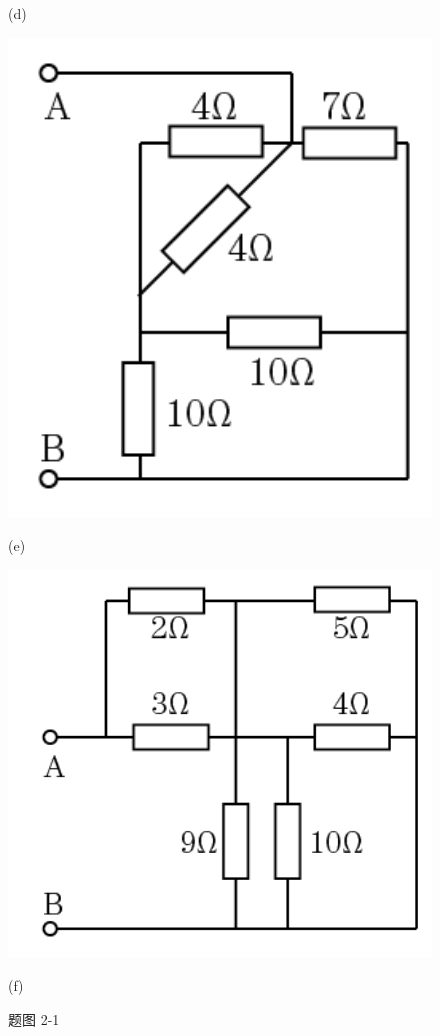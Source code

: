 \documentclass[hyperref, UTF8]{ctexart}
\begin{document}
\begin{figure}[!htb]
\begin{minipage}[t]{0.195\textwidth}
    \caption*{(d)}
  \end{minipage}
  \begin{minipage}[t]{0.177\textwidth}
    \centering
    \includegraphics[width=1\textwidth]{p2-1-e.png}
    \caption*{(e)}
  \end{minipage}
  \begin{minipage}[t]{0.219\textwidth}
    \centering
    \includegraphics[width=1\textwidth]{p2-1-f.png}
    \caption*{(f)}
  \end{minipage}
  \caption*{题图 2-1}
\end{figure}
\end{document}
